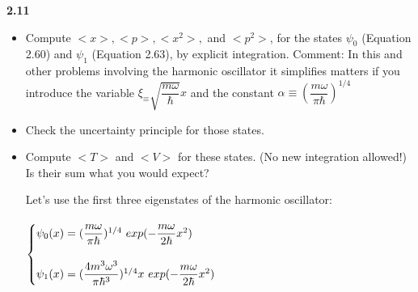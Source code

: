 \documentclass[fleqn]{article}
\begin{document}
  \textbf{2.11}
  \begin{itemize}
    \item Compute $<x>, <p>, <x^2>,$ and $<p^2>$, for the states $\psi_0$ (Equation 2.60) and $\psi_1$ (Equation 2.63), by explicit integration. Comment: In this and other problems involving 
    the harmonic oscillator it simplifies matters if you introduce the variable $\xi_\equiv \sqrt{\dfrac{m \omega}{\hbar}}x$ and the constant 
    $\alpha \equiv (\dfrac{m \omega}{\pi \hbar})^{1/4}$

    \item Check the uncertainty principle for those states.

    \item Compute $<T>$ and $<V>$ for these states. (No new integration allowed!) Is their sum what you would expect?

    \textcolor{hwColor}{
      Let's use the first three eigenstates of the harmonic oscillator: \\ \\
      $
        \begin{cases}
          \psi_0(x)=(\dfrac{m \omega}{\pi \hbar})^{1/4} ~ exp(-\dfrac{m \omega}{2\hbar}x^2) \\
          \\
          \psi_1(x)=(\dfrac{4m^3 \omega^3}{\pi \hbar^3})^{1/4}x ~ exp(-\dfrac{m \omega}{2\hbar}x^2) 
        \end{cases} \\ \\
      $
    }


\end{itemize}
\end{document}
